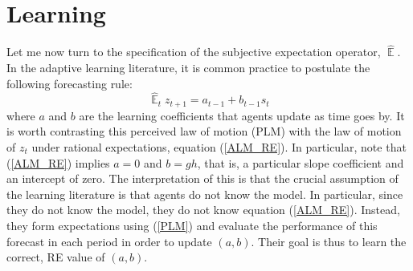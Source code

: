 \documentclass[11pt]{article}
\renewcommand{\[}{\begin{equation}}
\renewcommand{\]}{\end{equation}}
\DeclareMathOperator{\E}{\mathbb{E}}
\begin{document}
 \section{Learning}\label{learning}
Let me now turn to the specification of the subjective expectation operator, $\hat{\E}$. In the adaptive learning literature, it is common practice to postulate the following forecasting rule:
\begin{equation}
\hat{\E}_{t}z_{t+1} = a_{t-1} + b_{t-1} s_{t} \label{PLM}  
\end{equation}
where $a$ and $b$ are the learning coefficients that agents update as time goes by. It is worth contrasting this perceived law of motion (PLM) with the law of motion of $z_t$ under rational expectations, equation (\ref{ALM_RE}). In particular, note that (\ref{ALM_RE}) implies $a = 0$ and $b = gh$, that is, a particular slope coefficient and an intercept of zero. The interpretation of this is that the crucial assumption of the learning literature is that agents do not know the model. In particular, since they do not know the model, they do not know equation (\ref{ALM_RE}). Instead, they form expectations using (\ref{PLM}) and evaluate the performance of this forecast in each period in order to update $(a,b)$. Their goal is thus to learn the correct, RE value of $(a,b)$. 
\end{document}
